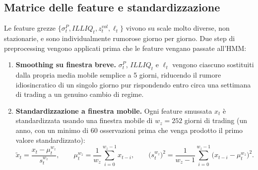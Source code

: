 \documentclass[11pt]{article}
\theoremstyle{definition}
\theoremstyle{remark}
\begin{document}
\subsection{Matrice delle feature e standardizzazione}
\label{sec:feature-matrix}

Le feature grezze $\{\sigma^P_t, ILLIQ_t, z^{vol}_t, \ell_t\}$ vivono su scale molto diverse, non stazionarie, e sono individualmente rumorose giorno per giorno. Due step di preprocessing vengono applicati prima che le feature vengano passate all'HMM:

\begin{enumerate}
    \item \textbf{Smoothing su finestra breve.} $\sigma^P_t$, $ILLIQ_t$ e $\ell_t$ vengono ciascuno sostituiti dalla propria media mobile semplice a 5 giorni, riducendo il rumore idiosincratico di un singolo giorno pur rispondendo entro circa una settimana di trading a un genuino cambio di regime.
    \item \textbf{Standardizzazione a finestra mobile.} Ogni feature smussata $x_t$ \`e standardizzata usando una finestra mobile di $w_z=252$ giorni di trading (un anno, con un minimo di 60 osservazioni prima che venga prodotto il primo valore standardizzato):
    \[
    \widetilde{x}_t = \frac{x_t - \mu_t^{w_z}}{s_t^{w_z}}, \qquad
    \mu_t^{w_z}=\frac{1}{w_z}\sum_{i=0}^{w_z-1}x_{t-i}, \qquad
    \big(s_t^{w_z}\big)^2=\frac{1}{w_z-1}\sum_{i=0}^{w_z-1}\big(x_{t-i}-\mu_t^{w_z}\big)^2.
    \]

\end{enumerate}
\end{document}
